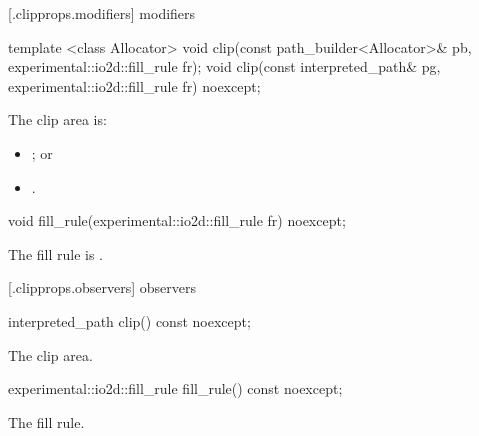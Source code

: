  [\iotwod.clipprops.modifiers] { modifiers}

%
\begin{itemdecl}
template <class Allocator>
void clip(const path_builder<Allocator>& pb, experimental::io2d::fill_rule fr);
void clip(const interpreted_path& pg, experimental::io2d::fill_rule fr) noexcept;
\end{itemdecl}
\begin{itemdescr}
\pnum
\effects
The clip area is:
\begin{itemize}
\item {}; or
\item {}.
\end{itemize}
\end{itemdescr}

%
\begin{itemdecl}
void fill_rule(experimental::io2d::fill_rule fr) noexcept;
\end{itemdecl}
\begin{itemdescr}
\pnum
\effects
The fill rule is .
\end{itemdescr}

 [\iotwod.clipprops.observers] { observers}

%
\begin{itemdecl}
interpreted_path clip() const noexcept;
\end{itemdecl}
\begin{itemdescr}
\pnum
\returns
The clip area.
\end{itemdescr}

%
\begin{itemdecl}
experimental::io2d::fill_rule fill_rule() const noexcept;
\end{itemdecl}
\begin{itemdescr}
\pnum
\returns
The fill rule.
\end{itemdescr}
